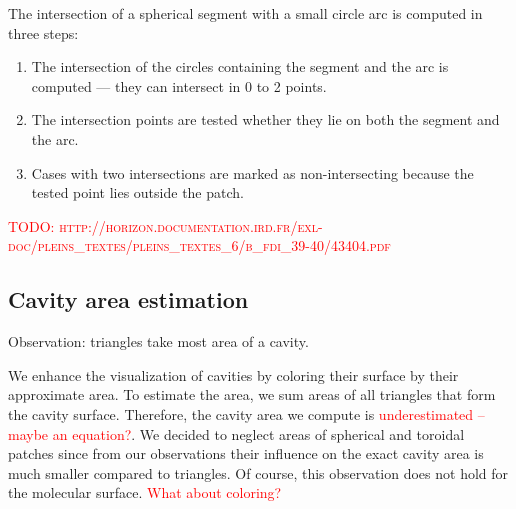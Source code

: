The intersection of a spherical segment with a small circle arc is computed in three steps:
\begin{enumerate}
  \item The intersection of the circles containing the segment and the arc is computed --- they can intersect in 0 to 2 points.
  \item The intersection points are tested whether they lie on both the segment and the arc.
  \item Cases with two intersections are marked as non-intersecting because the tested point lies outside the patch.
\end{enumerate}

\textcolor{red}{TODO: \textsc{http://horizon.documentation.ird.fr/exl-doc/pleins\_textes/pleins\_textes\_6/b\_fdi\_39-40/43404.pdf}}

\subsection{Cavity area estimation}
Observation: triangles take most area of a cavity.

We enhance the visualization of cavities by coloring their surface by their approximate area.
To estimate the area, we sum areas of all triangles that form the cavity surface.
Therefore, the cavity area we compute is \textcolor{red}{underestimated -- maybe an equation?}.
We decided to neglect areas of spherical and toroidal patches since from our observations their influence on the exact cavity area is much smaller compared to triangles.
Of course, this observation does not hold for the molecular surface.
\textcolor{red}{What about coloring?}
